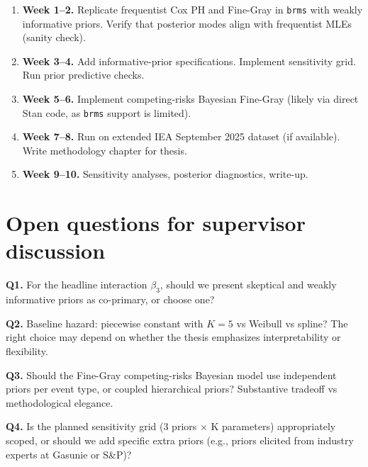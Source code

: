\documentclass[11pt,a4paper]{article}
\begin{document}
\begin{enumerate}
  \item \textbf{Week 1--2.} Replicate frequentist Cox PH and Fine-Gray in \texttt{brms} with weakly informative priors. Verify that posterior modes align with frequentist MLEs (sanity check).
  \item \textbf{Week 3--4.} Add informative-prior specifications. Implement sensitivity grid. Run prior predictive checks.
  \item \textbf{Week 5--6.} Implement competing-risks Bayesian Fine-Gray (likely via direct Stan code, as \texttt{brms} support is limited).
  \item \textbf{Week 7--8.} Run on extended IEA September 2025 dataset (if available). Write methodology chapter for thesis.
  \item \textbf{Week 9--10.} Sensitivity analyses, posterior diagnostics, write-up.
\end{enumerate}

\section{Open questions for supervisor discussion}

\begin{openquestion}
\textbf{Q1.} For the headline interaction $\beta_3$, should we present skeptical and weakly informative priors as co-primary, or choose one?
\end{openquestion}

\begin{openquestion}
\textbf{Q2.} Baseline hazard: piecewise constant with $K = 5$ vs Weibull vs spline? The right choice may depend on whether the thesis emphasizes interpretability or flexibility.
\end{openquestion}

\begin{openquestion}
\textbf{Q3.} Should the Fine-Gray competing-risks Bayesian model use independent priors per event type, or coupled hierarchical priors? Substantive tradeoff vs methodological elegance.
\end{openquestion}

\begin{openquestion}
\textbf{Q4.} Is the planned sensitivity grid (3 priors $\times$ K parameters) appropriately scoped, or should we add specific extra priors (e.g., priors elicited from industry experts at Gasunie or S\&P)?
\end{openquestion}
\end{document}
